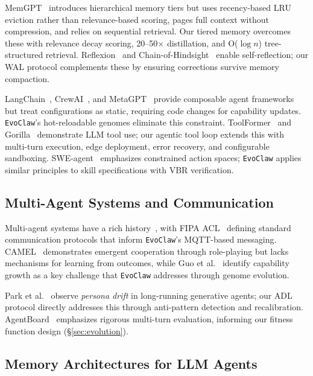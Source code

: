 \documentclass[conference]{IEEEtran}
\newcommand{\evoclaw}{\texttt{EvoClaw}\xspace}
\begin{document}
MemGPT~\cite{packer2023memgpt} introduces hierarchical memory tiers but uses recency-based LRU eviction rather than relevance-based scoring, pages full context without compression, and relies on sequential retrieval. Our tiered memory overcomes these with relevance decay scoring, 20--50$\times$ distillation, and O($\log n$) tree-structured retrieval. Reflexion~\cite{shinn2024reflexion} and Chain-of-Hindsight~\cite{liu2023chain} enable self-reflection; our WAL protocol complements these by ensuring corrections survive memory compaction.

LangChain~\cite{langchain}, CrewAI~\cite{crewai}, and MetaGPT~\cite{ge2023metagpt} provide composable agent frameworks but treat configurations as static, requiring code changes for capability updates. \evoclaw{}'s hot-reloadable genomes eliminate this constraint. ToolFormer~\cite{schick2023toolformer} and Gorilla~\cite{parisi2023gorilla} demonstrate LLM tool use; our agentic tool loop extends this with multi-turn execution, edge deployment, error recovery, and configurable sandboxing. SWE-agent~\cite{yang2024sweagent} emphasizes constrained action spaces; \evoclaw{} applies similar principles to skill specifications with VBR verification.

\subsection{Multi-Agent Systems and Communication}

Multi-agent systems have a rich history~\cite{wooldridge2009introduction, durfee1999distributed}, with FIPA ACL~\cite{fipa1997acl} defining standard communication protocols that inform \evoclaw{}'s MQTT-based messaging. CAMEL~\cite{li2023camel} demonstrates emergent cooperation through role-playing but lacks mechanisms for learning from outcomes, while Guo et al.~\cite{guo2024llm_multi_agents} identify capability growth as a key challenge that \evoclaw{} addresses through genome evolution.

Park et al.~\cite{park2023generative} observe \textit{persona drift} in long-running generative agents; our ADL protocol directly addresses this through anti-pattern detection and recalibration. AgentBoard~\cite{ma2024agentboard} emphasizes rigorous multi-turn evaluation, informing our fitness function design (\S\ref{sec:evolution}).

\subsection{Memory Architectures for LLM Agents}
\end{document}
